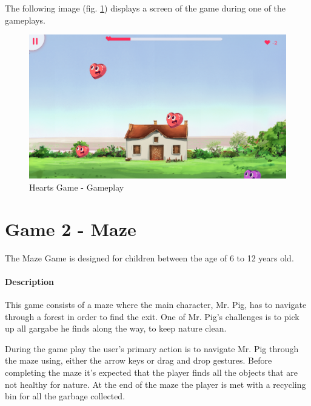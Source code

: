

The following image (fig. \ref{fig:heartsGameplay}) displays a screen of the game during one of the gameplays.

\begin{figure}[H]
    \centering
    \includegraphics[scale=0.45]{Chapters/gameplay/HeartsGame.png}
    \caption{Hearts Game - Gameplay}
    \label{fig:heartsGameplay}    
\end{figure}


\newpage
\section{Game 2 - Maze}

The Maze Game is designed for children between the age of 6 to 12 years old.

\paragraph{Description}

This game consists of a maze where the main character, Mr. Pig, has to navigate through a forest in order to find the exit. One of Mr. Pig's challenges is to pick up all gargabe he finds along the way, to keep nature clean.

During the game play the user's primary action is to navigate Mr. Pig through the maze using, either the arrow keys or drag and drop gestures. Before completing the maze it's expected that the player finds all the objects that are not healthy for nature.
At the end of the maze the player is met with a recycling bin for all the garbage collected.

